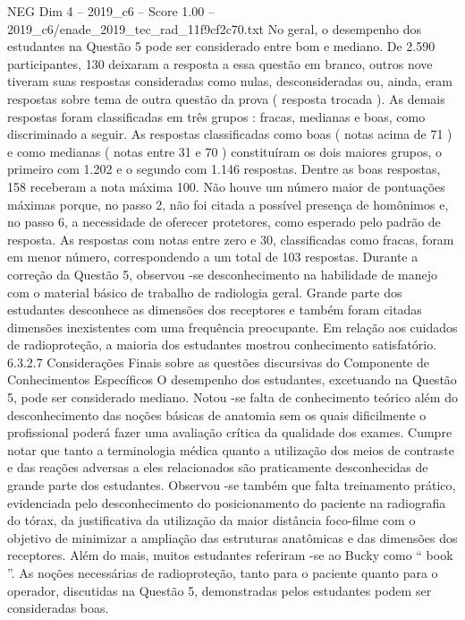 \begin{textsample}{NEG Dim 4 – 2019\_c6 – Score 1.00 – 2019\_c6/enade\_2019\_tec\_rad\_11f9cf2c70.txt}
No geral, o desempenho dos estudantes na Questão 5 pode ser considerado entre bom e mediano.
De 2.590 participantes, 130 deixaram a resposta a essa questão em branco, outros nove tiveram suas respostas consideradas como nulas, desconsideradas ou, ainda, eram respostas sobre tema de outra questão da prova ( resposta trocada ).
As demais respostas foram classificadas em três grupos : fracas, medianas e boas, como discriminado a seguir.
As respostas classificadas como boas ( notas acima de 71 ) e como medianas ( notas entre 31 e 70 ) constituíram os dois maiores grupos, o primeiro com 1.202 e o segundo com 1.146 respostas.
Dentre as boas respostas, 158 receberam a nota máxima 100.
Não houve um número maior de pontuações máximas porque, no passo 2, não foi citada a possível presença de homônimos e, no passo 6, a necessidade de oferecer protetores, como esperado pelo padrão de resposta.
As respostas com notas entre zero e 30, classificadas como fracas, foram em menor número, correspondendo a um total de 103 respostas.
Durante a correção da Questão 5, observou -se desconhecimento na habilidade de manejo com o material básico de trabalho de radiologia geral.
Grande parte dos estudantes desconhece as dimensões dos receptores e também foram citadas dimensões inexistentes com uma frequência preocupante.
Em relação aos cuidados de radioproteção, a maioria dos estudantes mostrou conhecimento satisfatório. 6.3.2.7 Considerações Finais sobre as questões discursivas do Componente de Conhecimentos Específicos O desempenho dos estudantes, excetuando na Questão 5, pode ser considerado mediano.
Notou -se falta de conhecimento teórico além do desconhecimento das noções básicas de anatomia sem os quais dificilmente o profissional poderá fazer uma avaliação crítica da qualidade dos exames.
Cumpre notar que tanto a terminologia médica quanto a utilização dos meios de contraste e das reações adversas a eles relacionados são praticamente desconhecidas de grande parte dos estudantes.
Observou -se também que falta treinamento prático, evidenciada pelo desconhecimento do posicionamento do paciente na radiografia do tórax, da justificativa da utilização da maior distância foco-filme com o objetivo de minimizar a ampliação das estruturas anatômicas e das dimensões dos receptores.
Além do mais, muitos estudantes referiram -se ao Bucky como “ book ”.
As noções necessárias de radioproteção, tanto para o paciente quanto para o operador, discutidas na Questão 5, demonstradas pelos estudantes podem ser consideradas boas.

\end{textsample}
